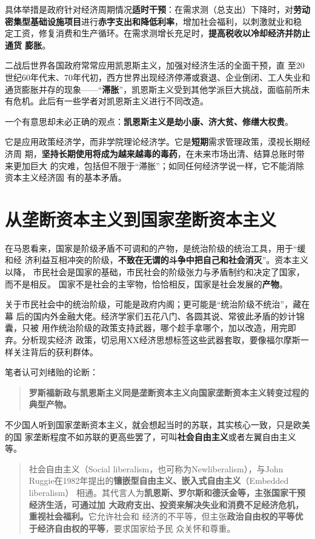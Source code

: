 具体举措是政府针对经济周期情况\textbf{适时干预}：在需求测（总支出）下降时，对\textbf{劳动
  密集型基础设施项目}进行\textbf{赤字支出和降低利率}，增加社会福利，以刺激就业和稳
定工资，修复消费和生产循环。在需求测增长充足时，\textbf{提高税收以冷却经济并防止通货
膨胀}。


二战后世界各国政府常常应用凯恩斯主义，加强对经济生活的全面干预，直
至20世纪60年代末、70年代初，西方世界出现经济停滞或衰退、企业倒闭、工人失业和
通货膨胀并存的现象——“\textbf{滞胀}”，凯恩斯主义受到其他学派巨大挑战，面临前所未
有危机。此后有一些学者对凯恩斯主义进行不同改造。

一个有意思却未必正确的观点：\textbf{凯恩斯主义是劫小康、济大贫、修缮大权贵}。

它是应用政策经济学，而非学院理论经济学。它是\textbf{短期}需求管理政策，漠视长期经济周
期，\textbf{坚持长期使用将成为越来越毒的毒药}，在未来市场出清、结算总账时带来更加巨大
的灾难，包括但不限于“滞胀”；如同任何经济学说一样，它不能消除资本主义经济固
有的基本矛盾。

\section{从垄断资本主义到国家垄断资本主义}

在马恩看来，国家是阶级矛盾不可调和的产物，是统治阶级的统治工具，用于“缓和经
济利益互相冲突的阶级，\textbf{不致在无谓的斗争中把自己和社会消灭}”。资本主义以降，
市民社会是国家的基础，市民社会的阶级张力与矛盾制约和决定了国家，而不是相反。
国家不是社会的主宰物，恰恰相反，国家是社会发展的\textbf{产物}。

关于市民社会中的统治阶级，可能是政府内阁；更可能是“统治阶级不统治”，藏在幕
后的国内外金融大佬。经济学家们五花八门、各圆其说、常彼此矛盾的妙计锦囊，只被
用作统治阶级的政策支持武器，哪个趁手拿哪个，加以改造，用完即弃。分析现实经济
政策，切忌用XX经济思想标签这些武器套取，要像福尔摩斯一样关注背后的获利群体。

笔者认可刘绪贻的论断：
\begin{quotation}
  \textbf{罗斯福新政与凯恩斯主义同是垄断资本主义向国家垄断资本主义转变过程的典型产物。}
\end{quotation}

不少国人听到国家垄断资本主义，就会想起当时的苏联，其实核心一致，只是欧美的国
家垄断程度不如苏联的更高些罢了，可叫\textbf{社会自由主义}或者左翼自由主义等。
\begin{quotation}
  社会自由主义（Social liberalism，也可称为Newliberalism），与John
  Ruggie在1982年提出的\textbf{镶嵌型自由主义、嵌入式自由主义}（Embedded liberalism）
  相通。其代言人为\textbf{凯恩斯、罗尔斯和德沃金等，主张国家干预经济生活，可通过加
    大政府支出、投资来解决失业和消费不足经济危机，重视社会福利。}它允许社会和
  经济的不平等，但主张\textbf{政治自由权的平等优于经济自由权的平等}，要求国家给予民
  众关怀和尊重。\cite{newneo}
\end{quotation}


